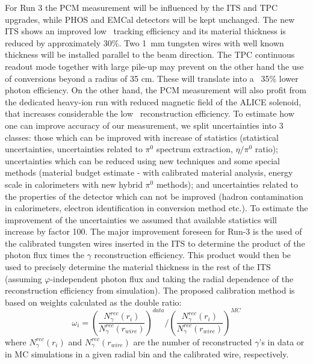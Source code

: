 For Run 3 the PCM measurement will be influenced by the ITS and TPC upgrades, while PHOS and EMCal detectors will be kept unchanged. 
The new ITS shows an improved low \pT \ tracking efficiency and its material thickness is reduced by approximately 30\%. Two 1\ mm tungsten wires with well known thickness will be installed parallel to the beam direction. 
The TPC continuous readout mode together with large pile-up may prevent on the other hand the use of conversions beyond a radius of 35 cm. These will translate
into a ~35\% lower photon efficiency. On the other hand, the PCM measurement will also profit from the dedicated heavy-ion run with reduced magnetic field of the ALICE solenoid, that increases considerable the low \pT \ reconstruction efficiency.
To estimate how one can improve accuracy of our measurement, we split uncertainties into 3 classes: those which can be improved with increase of statistics (statistical uncertainties, uncertainties related to $\pi^0$ spectrum extraction, $\eta/\pi^0$ ratio); uncertainties which can be reduced using new techniques and some special methods (material budget estimate - with calibrated material analysis, energy scale in calorimeters with new hybrid $\pi^0$ methods); and uncertainties related to the properties of the detector which can not be improved (hadron contamination in calorimeters, electron identification in conversion method etc.). To estimate the improvement of the uncertainties we assumed that available statistics will increase by factor 100. 
The major improvement foreseen for Run-3 is the used of the calibrated tungsten wires
inserted in the ITS to determine the product of the photon flux times the $\gamma$ reconstruction efficiency. This product would then be used to precisely determine the material thickness in the rest of the ITS (assuming $\varphi$-independent photon flux and taking the radial dependence of the reconstruction efficiency from simulation).
The proposed calibration method is based on weights calculated 
as the double ratio: 
\begin{equation}
\omega_i= 
{\left(\frac{N_\gamma^{rec}(r_i)}{N_\gamma^{rec}(r_{wire})}\right)^{data}} /
{\left(\frac{N_\gamma^{rec}(r_i)}{N_\gamma^{rec}(r_{wire})}\right)^{MC}} 
\end{equation}
where $N_\gamma^{rec}(r_i)$ and $N_\gamma^{rec}(r_{wire})$ are the number of reconstructed $\gamma$'s in data or in MC simulations in a given radial bin and the calibrated wire, respectively.
